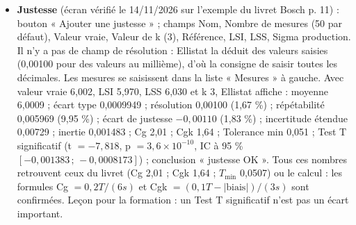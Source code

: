 \documentclass[10pt,a4paper]{article}
\begin{document}
\begin{itemize}
\item \textbf{Justesse} (écran vérifié le 14/11/2026 sur l'exemple du livret Bosch p. 11) : bouton « Ajouter une justesse » ; champs Nom, Nombre de mesures (50 par défaut), Valeur vraie, Valeur de k (3), Référence, LSI, LSS, Sigma production. Il n'y a pas de champ de résolution : Ellistat la déduit des valeurs saisies (0,00100 pour des valeurs au millième), d'où la consigne de saisir toutes les décimales. Les mesures se saisissent dans la liste « Mesures » à gauche. Avec valeur vraie 6,002, LSI 5,970, LSS 6,030 et k 3, Ellistat affiche : moyenne 6,0009 ; écart type 0,0009949 ; résolution 0,00100 (1,67 \%) ; répétabilité 0,005969 (9,95 \%) ; écart de justesse $-0{,}00110$ (1,83 \%) ; incertitude étendue 0,00729 ; inertie 0,001483 ; Cg 2,01 ; Cgk 1,64 ; Tolerance min 0,051 ; Test T significatif (t $= -7{,}818$, p $= 3{,}6 \times 10^{-10}$, IC à 95 \% $[-0{,}001383\,;\,-0{,}0008173]$) ; conclusion « justesse OK ». Tous ces nombres retrouvent ceux du livret (Cg 2,01 ; Cgk 1,64 ; $T_{\min}$ 0,0507) ou le calcul : les formules Cg $= 0{,}2T/(6s)$ et Cgk $= (0{,}1T - |\text{biais}|)/(3s)$ sont confirmées. Leçon pour la formation : un Test T significatif n'est pas un écart important.
\end{itemize}
\end{document}
